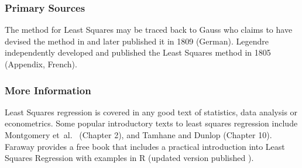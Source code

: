 \subsubsection{Primary Sources}
The method for Least Squares may be traced back to Gauss who claims to have devised the method in and later published it in 1809 \cite{Gauss1809, Gauss1823} (German). Legendre independently developed and published the Least Squares method in 1805 \cite{Legendre1805} (Appendix, French).

\subsubsection{More Information}
Least Squares regression is covered in any good text of statistics, data analysis or econometrics. Some popular introductory texts to least squares regression include Montgomery et~al.\ \cite{Montgomery2001} (Chapter 2), and Tamhane and Dunlop \cite{Tamhane2000} (Chapter 10).
Faraway provides a free book that includes a practical introduction into Least Squares Regression with examples in R \cite{Faraway2002} (updated version published \cite{Faraway2004}).



